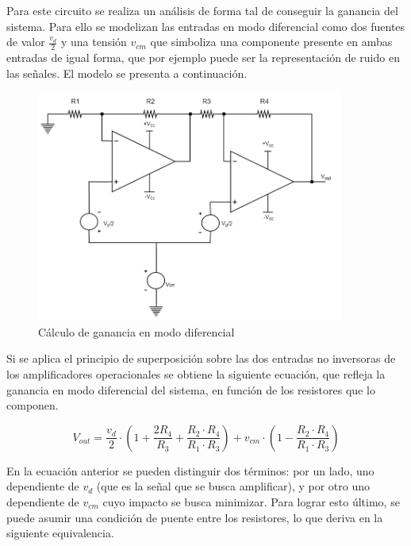  
Para este circuito se realiza un an\'alisis de forma tal de conseguir la ganancia del sistema. Para ello se modelizan las entradas en modo diferencial como dos fuentes de valor $\frac{v_d}{2}$ y una tensi\'on $v_{cm}$ que simboliza una componente presente en ambas entradas de igual forma, que por ejemplo puede ser la representaci\'on de ruido en las se\~nales. El modelo se presenta a continuaci\'on.

\begin{figure}[H]
    \centering
    \includegraphics[width=0.9\textwidth]{../EJ4/resources/2opamp_difmode_gain.png}
    \caption{C\'alculo de ganancia en modo diferencial}
    \label{fig:EJ4_2opamp_difmode_gain}
\end{figure}

Si se aplica el principio de superposici\'on sobre las dos entradas no inversoras de los amplificadores operacionales se obtiene la siguiente ecuaci\'on, que refleja la ganancia en modo diferencial del sistema, en funci\'on de los resistores que lo componen.

\begin{equation}
V_{out} = \frac{v_d}{2} \cdot \left( 1 + \frac{2R_4}{R_3} + \frac{R_2 \cdot R_4}{R_1 \cdot R_3} \right) + v_{cm} \cdot \left( 1 - \frac{R_2 \cdot R_4}{R_1 \cdot R_3} \right)
\label{EJ4_vout}
\end{equation}

En la ecuaci\'on anterior se pueden distinguir dos t\'erminos: por un lado, uno dependiente de $v_d$ (que es la se\~nal que se busca amplificar), y por otro uno dependiente de $v_{cm}$ cuyo impacto se busca minimizar. Para lograr esto \'ultimo, se puede asumir una condici\'on de puente entre los resistores,  lo que deriva en la siguiente equivalencia.

